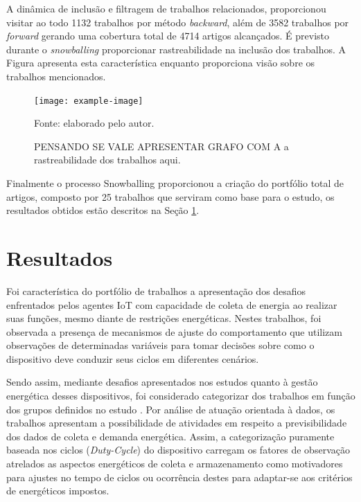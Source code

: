 A dinâmica de inclusão e filtragem de trabalhos relacionados, proporcionou visitar ao todo 1132 trabalhos por método \textit{backward}, além de 3582 trabalhos por \textit{forward} gerando uma cobertura total de 4714 artigos alcançados. É previsto durante o \textit{snowballing} proporcionar rastreabilidade na inclusão dos trabalhos. A Figura apresenta esta característica enquanto proporciona visão sobre os trabalhos mencionados. 

\begin{figure}[H]
	\centering	
	\caption{PENSANDO SE VALE APRESENTAR GRAFO COM A a rastreabilidade dos trabalhos aqui.} 
	\label{fig:cap3etapassnowballing}
	\noindent\texttt{[image: example-image]} 
	
	Fonte: elaborado pelo autor.
\end{figure}

Finalmente o processo Snowballing proporcionou a criação do portfólio total de artigos, composto por 25 trabalhos que serviram como base para o estudo, os resultados obtidos estão descritos na Seção \ref{cap3:resultados}.


\section{Resultados}
\label{cap3:resultados}

Foi característica do portfólio de trabalhos a apresentação dos desafios enfrentados pelos agentes \acs{IoT} com capacidade de coleta de energia ao realizar suas funções, mesmo diante de restrições energéticas. Nestes trabalhos, foi observada a presença de mecanismos de ajuste do comportamento que utilizam observações de determinadas variáveis para tomar decisões sobre como o dispositivo deve conduzir seus ciclos em diferentes cenários.

Sendo assim, mediante desafios apresentados nos estudos quanto à gestão energética desses dispositivos, foi considerado categorizar dos trabalhos em função dos grupos definidos no estudo \cite{khan_energy_2015}. Por análise de atuação orientada à dados, os trabalhos apresentam a possibilidade de atividades em respeito a previsibilidade dos dados de coleta e demanda energética. Assim, a categorização puramente baseada nos ciclos (\textit{Duty-Cycle}) do dispositivo carregam os fatores de observação atrelados as aspectos energéticos de coleta e armazenamento como motivadores para ajustes no tempo de ciclos ou ocorrência destes para adaptar-se aos critérios de energéticos impostos.

